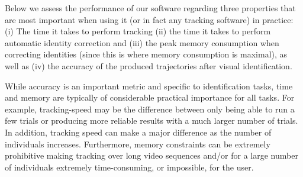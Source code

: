 \documentclass[9pt,lineno]{elife}
\newcommand{\changemade}[1]{#1}
\begin{document}
Below we assess the performance \changemade{of our software} regarding three properties that are most important when using it (or in fact any tracking software) in practice: (i) The time it takes to perform tracking (ii) the time it takes to perform automatic identity correction and (iii) the peak memory consumption when correcting identities (since this is where memory consumption is maximal), as well as (iv) the accuracy of the produced trajectories after visual identification.


While accuracy is an important metric and specific to identification tasks, time and memory are typically of considerable practical importance for all tasks. For example, tracking-speed may be the difference between only being able to run a few trials or producing more reliable results with a much larger number of trials. In addition, tracking speed can make a major difference as the number of individuals increases. Furthermore, memory constraints can be extremely prohibitive making tracking over long video sequences and/or for a large number of individuals extremely time-consuming, or impossible, for the user.
\end{document}
